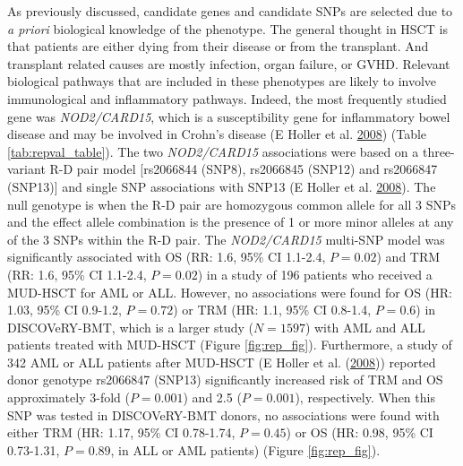 \documentclass[]{DissertateOSU}
\begin{document}
As previously discussed, candidate genes and candidate SNPs are selected
due to \emph{a priori} biological knowledge of the phenotype. The
general thought in HSCT is that patients are either dying from their
disease or from the transplant. And transplant related causes are mostly
infection, organ failure, or GVHD. Relevant biological pathways that are
included in these phenotypes are likely to involve immunological and
inflammatory pathways. Indeed, the most frequently studied gene was
\emph{NOD2/CARD15}, which is a susceptibility gene for inflammatory
bowel disease and may be involved in Crohn's disease (E Holler et al.
\protect\hyperlink{ref-holler_2008}{2008}) (Table
\ref{tab:repval_table}). The two \emph{NOD2/CARD15} associations were
based on a three-variant R-D pair model {[}rs2066844 (SNP8), rs2066845
(SNP12) and rs2066847 (SNP13){]} and single SNP associations with SNP13
(E Holler et al. \protect\hyperlink{ref-holler_2008}{2008}). The null
genotype is when the R-D pair are homozygous common allele for all 3
SNPs and the effect allele combination is the presence of 1 or more
minor alleles at any of the 3 SNPs within the R-D pair. The
\emph{NOD2/CARD15} multi-SNP model was significantly associated with OS
(RR: 1.6, 95\% CI 1.1-2.4, \(P=0.02\)) and TRM (RR: 1.6, 95\% CI
1.1-2.4, \(P=0.02\)) in a study of 196 patients who received a MUD-HSCT
for AML or ALL. However, no associations were found for OS (HR: 1.03,
95\% CI 0.9-1.2, \(P=0.72\)) or TRM (HR: 1.1, 95\% CI 0.8-1.4,
\(P=0.6\)) in DISCOVeRY-BMT, which is a larger study (\(N=1597\)) with
AML and ALL patients treated with MUD-HSCT (Figure \ref{fig:rep_fig}).
Furthermore, a study of 342 AML or ALL patients after MUD-HSCT (E Holler
et al. (\protect\hyperlink{ref-holler_2008}{2008})) reported donor
genotype rs2066847 (SNP13) significantly increased risk of TRM and OS
approximately 3-fold (\(P=0.001\)) and 2.5 (\(P=0.001\)), respectively.
When this SNP was tested in DISCOVeRY-BMT donors, no associations were
found with either TRM (HR: 1.17, 95\% CI 0.78-1.74, \(P=0.45\)) or OS
(HR: 0.98, 95\% CI 0.73-1.31, \(P=0.89\), in ALL or AML patients)
(Figure \ref{fig:rep_fig}).
\end{document}
